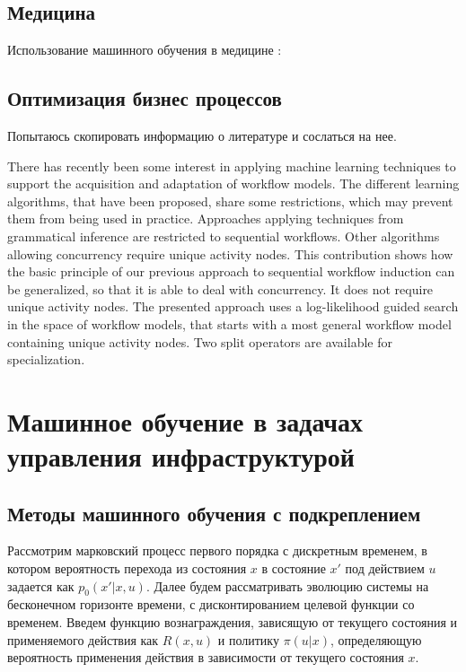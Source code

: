 \subsection{Медицина}
Использование машинного обучения в медицине : \cite{shipp2002diffuse} \cite{ye2003predicting}

\subsection{Оптимизация бизнес процессов} \label{sect1_2_1}
Попытаюсь скопировать информацию о литературе и сослаться на нее.

There has recently been some interest in applying machine learning techniques to support the acquisition and adaptation of workflow models. The different learning algorithms, that have been proposed, share some restrictions, which may prevent them from being used in practice. Approaches applying techniques from grammatical inference are restricted to sequential workflows. Other algorithms allowing concurrency require unique activity nodes. This contribution shows how the basic principle of our previous approach to sequential workflow induction can be generalized, so that it is able to deal with concurrency. It does not require unique activity nodes. The presented approach uses a log-likelihood guided search in the space of workflow models, that starts with a most general workflow model containing unique activity nodes. Two split operators are available for specialization. \cite{Herbst2000}

\section{Машинное обучение в задачах управления инфраструктурой}

\subsection{Методы машинного обучения с подкреплением}

Рассмотрим марковский процесс первого порядка с дискретным временем, в котором  вероятность перехода из состояния $x$ в состояние $x'$ под действием $u$ задается как $p_0(x'|x,u)$.  Далее будем рассматривать эволюцию системы на бесконечном горизонте времени, с дисконтированием целевой функции со временем. Введем функцию вознаграждения, зависящую от текущего состояния и применяемого действия  как $R(x,u)$ и политику $\pi(u|x)$, определяющую вероятность применения действия в зависимости от текущего состояния $x$.

